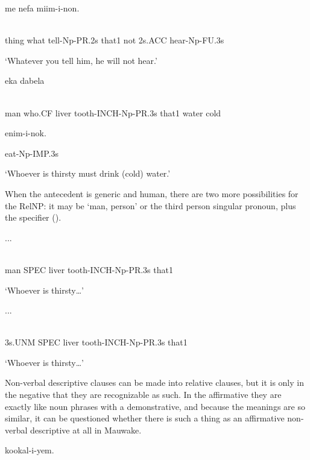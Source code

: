 \ea%
\label{ex:x1562}
  me  nefa  miim-i-non. \\
      \\
\glt
\z

thing  what  tell-Np-PR.2s  that1  not  2s.ACC  hear-Np-FU.3s

`Whatever you tell him, he will not hear.'

\ea%
\label{ex:x1563}
  eka  dabela  \\
      \\
\glt
\z

man  who.CF  liver  tooth-INCH-Np-PR.3s  that1  water  cold

enim-i-nok.

eat-Np-IMP.3s

`Whoever is thirsty must drink (cold) water.'

When the antecedent is generic and human, there are two more possibilities for the RelNP: it may be  `man, person' or the third person singular pronoun, plus the specifier  (). 

\ea%
\label{ex:x1564}
  ... \\
      \\
\glt
\z

man  SPEC  liver  tooth-INCH-Np-PR.3s  that1

`Whoever is thirsty{\dots}'

\ea%
\label{ex:x1565}
  ... \\
      \\
\glt
\z

3s.UNM  SPEC  liver  tooth-INCH-Np-PR.3s  that1

`Whoever is thirsty{\dots}' 

Non-verbal descriptive clauses can be made into relative clauses, but it is only in the negative that they are recognizable as such. In the affirmative they are exactly like noun phrases with a demonstrative, and because the meanings are so similar, it can be questioned whether there is such a thing as an affirmative non-verbal descriptive  at all in Mauwake.  

\ea%
\label{ex:x1550}
  kookal-i-yem. \\
      \\
\glt
\z

